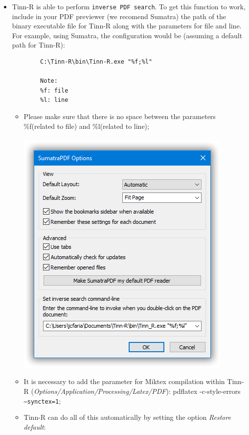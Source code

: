 \begin{itemize}
  \item Tinn-R is able to perform \texttt{inverse PDF search}. To get this
    function to work, include in your PDF previewer (we recomend Sumatra) the path of the
    binary executable file for Tinn-R along with the parameters for
    file and line.  For example, using Sumatra, the configuration
    would be (assuming a default path for Tinn-R):

    \begin{footnotesize}
      \begin{verbatim}
        C:\Tinn-R\bin\Tinn-R.exe "%f;%l"
        
        Note:
        %f: file
        %l: line
      \end{verbatim}
    \end{footnotesize}

    \begin{itemize}
      \item Please make sure that there is no space between the
        parameters \%f(related to file) and \%l(related to line);\\\\
        \includegraphics[scale=1]{./res/sumatra.png}\\
      \item It is necessary to add the parameter for Miktex compilation
        within Tinn-R (\textit{Options/Application/Processing/Latex/PDF}):
        pdflatex -c-style-errors \texttt{ --synctex=1};
      \item Tinn-R can do all of this automatically by setting the
        option \textit{Restore default}:


\end{itemize}
\end{itemize}
